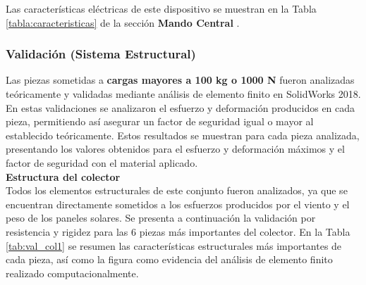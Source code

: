 Las características eléctricas de este dispositivo se muestran en la Tabla \ref{tabla:caracteristicas} de la sección \textbf{Mando Central} \cite{DDEs2}.

\newpage
\subsubsection{Validación (Sistema Estructural)}
Las piezas sometidas a \textbf{cargas mayores a 100 kg o 1000 N} fueron analizadas teóricamente y validadas mediante análisis de elemento finito en SolidWorks 2018. En estas validaciones se analizaron el esfuerzo y deformación producidos en cada pieza, permitiendo así asegurar un factor de seguridad igual o mayor al establecido teóricamente. Estos resultados se muestran para cada pieza analizada, presentando los valores obtenidos para el esfuerzo y deformación máximos y el factor de seguridad con el material aplicado.\\

\textbf{Estructura del colector}\\
Todos los elementos estructurales de este conjunto fueron analizados, ya que se encuentran directamente sometidos a los esfuerzos producidos por el viento y el peso de los paneles solares. Se presenta a continuación la validación por resistencia y rigidez para las 6 piezas más importantes del colector. En la Tabla \ref{tab:val_col1} se resumen las características estructurales más importantes de cada pieza, así como la figura como evidencia del análisis de elemento finito realizado computacionalmente.

